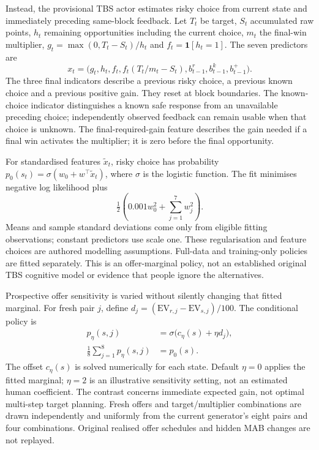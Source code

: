 \documentclass[11pt,a4paper]{article}
\begin{document}
Instead, the provisional TBS actor estimates risky choice from current state and immediately preceding same-block feedback. Let $T_t$ be target, $S_t$ accumulated raw points, $h_t$ remaining opportunities including the current choice, $m_t$ the final-win multiplier, $g_t=\max(0,T_t-S_t)/h_t$ and $f_t=\mathbf{1}[h_t=1]$. The seven predictors are
\begin{equation}
x_t=\big(g_t,h_t,f_t,f_t(T_t/m_t-S_t),b^r_{t-1},b^k_{t-1},b^+_{t-1}\big).
\end{equation}
The three final indicators describe a previous risky choice, a previous known choice and a previous positive gain. They reset at block boundaries. The known-choice indicator distinguishes a known safe response from an unavailable preceding choice; independently observed feedback can remain usable when that choice is unknown. The final-required-gain feature describes the gain needed if a final win activates the multiplier; it is zero before the final opportunity.

For standardised features $\widetilde{x}_t$, risky choice has probability $p_0(s_t)=\sigma(w_0+w^\top\widetilde{x}_t)$, where $\sigma$ is the logistic function. The fit minimises negative log likelihood plus
\begin{equation}
\tfrac12\left(0.001w_0^2+\sum_{j=1}^{7}w_j^2\right).
\end{equation}
Means and sample standard deviations come only from eligible fitting observations; constant predictors use scale one. These regularisation and feature choices are authored modelling assumptions. Full-data and training-only policies are fitted separately. This is an offer-marginal policy, not an established original TBS cognitive model or evidence that people ignore the alternatives.

Prospective offer sensitivity is varied without silently changing that fitted marginal. For fresh pair $j$, define $d_j=(\mathrm{EV}_{r,j}-\mathrm{EV}_{s,j})/100$. The conditional policy is
\begin{align}
p_\eta(s,j)&=\sigma\big(c_\eta(s)+\eta d_j\big),\\
\frac{1}{8}\sum_{j=1}^{8}p_\eta(s,j)&=p_0(s).
\end{align}
The offset $c_\eta(s)$ is solved numerically for each state. Default $\eta=0$ applies the fitted marginal; $\eta=2$ is an illustrative sensitivity setting, not an estimated human coefficient. The contrast concerns immediate expected gain, not optimal multi-step target planning. Fresh offers and target/multiplier combinations are drawn independently and uniformly from the current generator's eight pairs and four combinations. Original realised offer schedules and hidden MAB changes are not replayed.
\end{document}
